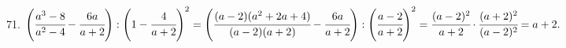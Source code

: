 71. $\left(\cfrac{a^3-8}{a^2-4}-\cfrac{6a}{a+2}\right): \left(1-\cfrac{4}{a+2}\right)^2=
\left(\cfrac{(a-2)(a^2+2a+4)}{(a-2)(a+2)}-\cfrac{6a}{a+2}\right): \left(\cfrac{a-2}{a+2}\right)^2=
\cfrac{(a-2)^2}{a+2}\cdot\cfrac{(a+2)^2}{(a-2)^2}=a+2.$\\
